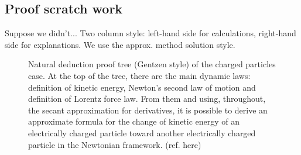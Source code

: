 \subsection{Proof scratch work}
%
Suppose we didn't... Two column style: left-hand side for calculations, right-hand side for explanations. We use the approx. method solution style.
%
%
\begin{figure}[bt]
  \capstart
  \begin{center}
  \footnotesize
\begin{prooftree}
\end{prooftree}
  \normalsize
  \end{center}
  \caption[Natural deduction charged particles]{Natural deduction proof tree (Gentzen style) of the charged particles case. At the top of the tree, there are the main dynamic laws: definition of kinetic energy, Newton's second law of motion and definition of Lorentz force law. From them and using, throughout, the secant approximation for derivatives, it is possible to derive an approximate formula for the change of kinetic energy of an electrically charged particle toward another electrically charged particle in the Newtonian framework. (ref. here)}
  \label{fig:natdeducchargedpart}
\end{figure}
%
%
%
%
